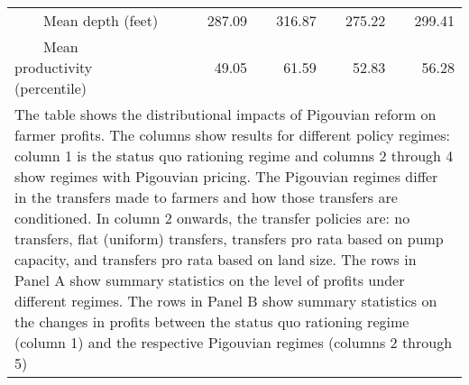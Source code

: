 \begin{table}[!ht]
\begin{tabular}{lrrrrr}
		~~~~Mean depth (feet)&  &287.09&316.87&275.22&299.41\\
		~~~~Mean productivity (percentile)&  &49.05&61.59&52.83&56.28\\
		\bottomrule
\multicolumn{6}{p{0.80\hsize}}{\footnotesize The table shows the distributional impacts of Pigouvian reform on farmer profits. The columns show results for different policy regimes: column 1 is the status quo rationing regime and columns 2 through 4 show regimes with Pigouvian pricing. The Pigouvian regimes differ in the transfers made to farmers and how those transfers are conditioned. In column 2 onwards, the transfer policies are: no transfers, flat (uniform) transfers, transfers pro rata based on pump capacity, and transfers pro rata based on land size. The rows in Panel A show summary statistics on the level of profits under different regimes. The rows in Panel B show summary statistics on the changes in profits between the status quo rationing regime (column 1) and the respective Pigouvian regimes (columns 2 through 5)} \\
	\end{tabular}
\end{table}

